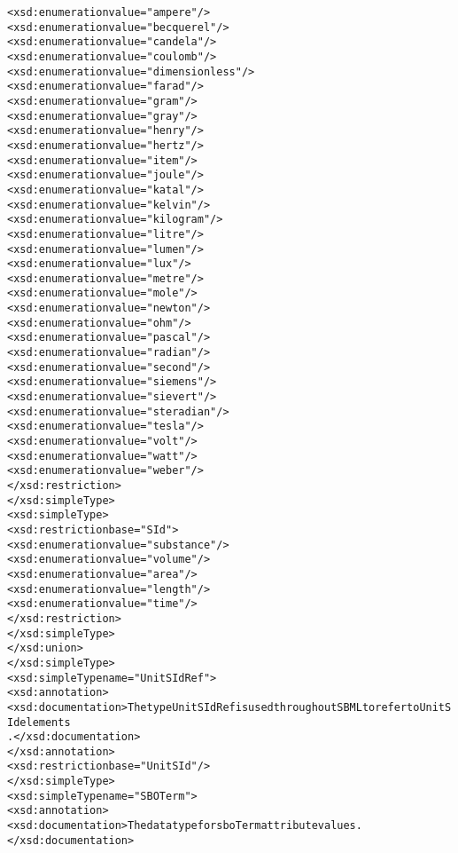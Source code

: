 \begin{alltt}
                    <xsd:enumeration value="ampere"/>
                    <xsd:enumeration value="becquerel"/>
                    <xsd:enumeration value="candela"/>
                    <xsd:enumeration value="coulomb"/>
                    <xsd:enumeration value="dimensionless"/>
                    <xsd:enumeration value="farad"/>
                    <xsd:enumeration value="gram"/>
                    <xsd:enumeration value="gray"/>
                    <xsd:enumeration value="henry"/>
                    <xsd:enumeration value="hertz"/>
                    <xsd:enumeration value="item"/>
                    <xsd:enumeration value="joule"/>
                    <xsd:enumeration value="katal"/>
                    <xsd:enumeration value="kelvin"/>
                    <xsd:enumeration value="kilogram"/>
                    <xsd:enumeration value="litre"/>
                    <xsd:enumeration value="lumen"/>
                    <xsd:enumeration value="lux"/>
                    <xsd:enumeration value="metre"/>
                    <xsd:enumeration value="mole"/>
                    <xsd:enumeration value="newton"/>
                    <xsd:enumeration value="ohm"/>
                    <xsd:enumeration value="pascal"/>
                    <xsd:enumeration value="radian"/>
                    <xsd:enumeration value="second"/>
                    <xsd:enumeration value="siemens"/>
                    <xsd:enumeration value="sievert"/>
                    <xsd:enumeration value="steradian"/>
                    <xsd:enumeration value="tesla"/>
                    <xsd:enumeration value="volt"/>
                    <xsd:enumeration value="watt"/>
                    <xsd:enumeration value="weber"/>
                </xsd:restriction>
            </xsd:simpleType>
            <xsd:simpleType>
                <xsd:restriction base="SId">
                    <xsd:enumeration value="substance"/>
                    <xsd:enumeration value="volume"/>
                    <xsd:enumeration value="area"/>
                    <xsd:enumeration value="length"/>
                    <xsd:enumeration value="time"/>
                </xsd:restriction>
            </xsd:simpleType>
        </xsd:union>
    </xsd:simpleType>
    <xsd:simpleType name="UnitSIdRef">
        <xsd:annotation>
            <xsd:documentation>The type UnitSIdRef is used throughout SBML to refer to UnitSId elements
            .</xsd:documentation>
        </xsd:annotation>
        <xsd:restriction base="UnitSId"/>
    </xsd:simpleType>    
    <xsd:simpleType name="SBOTerm">
        <xsd:annotation>
            <xsd:documentation>The data type for sboTerm attribute values.</xsd:documentation>

\end{alltt}
